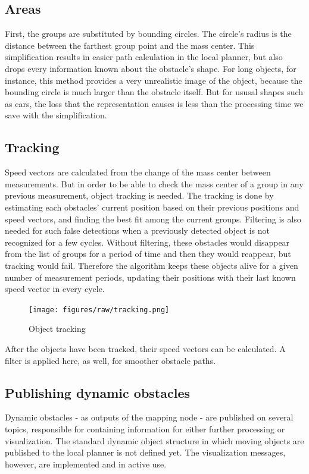 \subsection{Areas}
First, the groups are substituted by bounding circles. The circle's radius is the distance between the farthest group point and the mass center. This simplification results in easier path calculation in the local planner, but also drops every information known about the obstacle's shape. For long objects, for instance, this method provides a very unrealistic image of the object, because the bounding circle is much larger than the obstacle itself. But for ususal shapes such as cars, the loss that the representation causes is less than the processing time we save with the simplification.

\subsection{Tracking}
\label{chap:tracking}
Speed vectors are calculated from the change of the mass center between measurements. But in order to be able to check the mass center of a group in any previous measurement, object tracking is needed. The tracking is done by estimating each obstacles' current position based on their previous positions and speed vectors, and finding the best fit among the current groups. Filtering is also needed for such false detections when a previously detected object is not recognized for a few cycles. Without filtering, these obstacles would disappear from the list of groups for a period of time and then they would reappear, but tracking would fail. Therefore the algorithm keeps these objects alive for a given number of measurement periods, updating their positions with their last known speed vector in every cycle.

\begin{figure}[!ht]
    \centering
    \texttt{[image: figures/raw/tracking.png]}
    \caption{Object tracking}
    \label{tracking}
\end{figure}

After the objects have been tracked, their speed vectors can be calculated. A filter is applied here, as well, for smoother obstacle paths.

\subsection{Publishing dynamic obstacles}
Dynamic obstacles - as outputs of the mapping node - are published on several topics, responsible for containing information for either further processing or visualization. The standard dynamic object structure in which moving objects are published to the local planner is not defined yet. The visualization messages, however, are implemented and in active use.

